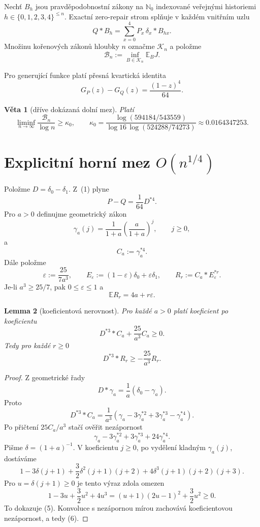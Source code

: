 \documentclass[11pt,a4paper]{article}
\newtheorem{theorem}{Věta}
\newtheorem{lemma}[theorem]{Lemma}
\theoremstyle{definition}
\theoremstyle{remark}
\theoremstyle{plain}
\newcommand{\E}{\mathbb E}
\newcommand{\cK}{\mathcal K}
\begin{document}
Nechť $B_h$ jsou pravděpodobnostní zákony na $\mathbb N_0$ indexované
veřejnými historiemi $h\in\{0,1,2,3,4\}^{\le n}$. Exactní zero-repair
strom splňuje v každém vnitřním uzlu
\[
Q*B_h=\sum_{x=0}^4 P_x\,\delta_x*B_{hx}.
\tag{ZR}
\]
Množinu kořenových zákonů hloubky $n$ označme $\cK_n$ a položme
\[
\mathcal B_n:=\inf_{B\in\cK_n}\E_B J.
\]

Pro generující funkce platí přesná kvartická identita
\[
G_P(z)-G_Q(z)=\frac{(1-z)^4}{64}.
\tag{1}
\]

\begin{theorem}[dříve dokázaná dolní mez]
Platí
\[
\liminf_{n\to\infty}\frac{\mathcal B_n}{\log n}\ge \kappa_0,
\qquad
\kappa_0=
\frac{\log(594184/543559)}
{\log 16\,\log(524288/74273)}
\approx0.0164347253.
\]
\end{theorem}

\section{Explicitní horní mez $O(n^{1/4})$}

Položme $D=\delta_0-\delta_1$. Z~(1) plyne
\[
P-Q=\frac1{64}D^{*4}.
\tag{2}
\]
Pro $a>0$ definujme geometrický zákon
\[
\gamma_a(j)=\frac1{1+a}\left(\frac a{1+a}\right)^j,
\qquad j\ge0,
\]
a
\[
C_a:=\gamma_a^{*4}.
\]
Dále položme
\[
\varepsilon:=\frac{25}{7a^3},
\qquad
E_\varepsilon:=(1-\varepsilon)\delta_0+\varepsilon\delta_1,
\qquad
R_r:=C_a*E_\varepsilon^{*r}.
\tag{3}
\]
Je-li $a^3\ge25/7$, pak $0\le\varepsilon\le1$ a
\[
\E R_r=4a+r\varepsilon.
\tag{4}
\]

\begin{lemma}[koeficientová nerovnost]
Pro každé $a>0$ platí koeficient po koeficientu
\[
D^{*3}*C_a+\frac{25}{a^3}C_a\ge0.
\tag{5}
\]
Tedy pro každé $r\ge0$
\[
D^{*3}*R_r\ge-\frac{25}{a^3}R_r.
\tag{6}
\]
\end{lemma}

\begin{proof}
Z geometrické řady
\[
D*\gamma_a=\frac1a(\delta_0-\gamma_a).
\]
Proto
\[
D^{*3}*C_a
=
\frac1{a^3}
\left(
\gamma_a-3\gamma_a^{*2}+3\gamma_a^{*3}-\gamma_a^{*4}
\right).
\]
Po přičtení $25C_a/a^3$ stačí ověřit nezápornost
\[
\gamma_a-3\gamma_a^{*2}+3\gamma_a^{*3}+24\gamma_a^{*4}.
\]
Pišme $\delta=(1+a)^{-1}$. V koeficientu $j\ge0$, po vydělení
kladným $\gamma_a(j)$, dostáváme
\[
1-3\delta(j+1)
+\frac32\delta^2(j+1)(j+2)
+4\delta^3(j+1)(j+2)(j+3).
\]
Pro $u=\delta(j+1)\ge0$ je tento výraz zdola omezen
\[
1-3u+\frac32u^2+4u^3
=
(u+1)(2u-1)^2+\frac32u^2\ge0.
\]
To dokazuje (5). Konvoluce s nezápornou mírou zachovává
koeficientovou nezápornost, a tedy (6).
\end{proof}
\end{document}
